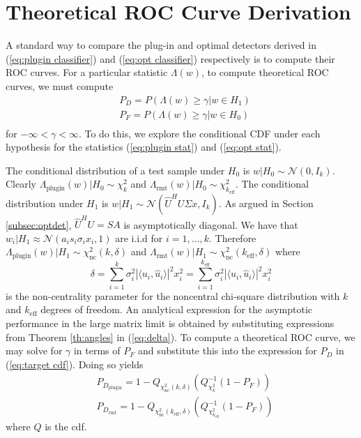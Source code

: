 \section{Theoretical ROC Curve Derivation}\label{sec:roc}
A standard way to compare the plug-in and optimal detectors derived in (\ref{eq:plugin classifier}) and (\ref{eq:opt classifier}) respectively is to compute their ROC curves. For a particular statistic $\Lambda(w)$, to compute theoretical ROC curves, we must compute
\begin{equation}\label{eq:target cdf}
\begin{aligned}
&P_D = P(\Lambda(w) \geq \gamma| w\in H_1)\\
&P_F = P(\Lambda(w) \geq \gamma| w\in H_0)\\
\end{aligned}
\end{equation}
for $-\infty<\gamma<\infty$. To do this, we explore the conditional CDF under each hypothesis for the statistics (\ref{eq:plugin stat}) and (\ref{eq:opt stat}).

The conditional distribution of a test sample under $H_0$ is $w|H_0\sim\mathcal{N}(0,I_k)$. Clearly $\Lambda_\text{plugin}(w)|H_0\sim\chi_k^2$ and $\Lambda_\text{rmt}(w)|H_0\sim\chi_{k_\text{eff}}^2$. The conditional distribution under $H_1$ is $w|H_1\sim\mathcal{N}(\widehat{U}^HU\Sigma x,I_k)$. As argued in Section \ref{subsec:optdet}, $\widehat{U}^HU=SA$ is asymptotically diagonal. We have that $w_i|H_1\approx\mathcal{N}(a_is_i\sigma_ix_i,1)$ are i.i.d for $i=1,\dots,k$. Therefore $\Lambda_\text{plugin}(w)|H_1\sim\chi_\text{nc}^2(k,\delta)$ and $\Lambda_\text{rmt}(w)|H_1\sim\chi_\text{nc}^2(k_\text{eff},\delta)$ where
\begin{equation}\label{eq:delta}
\delta=\sum_{i=1}^k\sigma_i^2|\langle u_i,\widehat{u}_i\rangle|^2x_i^2=\sum_{i=1}^{k_\text{eff}}\sigma_i^2|\langle u_i,\widehat{u}_i\rangle|^2x_i^2
 \end{equation}
is the non-centrality parameter for the noncentral chi-square distribution with $k$ and $k_\text{eff}$ degrees of freedom. An analytical expression for the asymptotic performance in the large matrix limit  is obtained by substituting expressions from Theorem \ref{th:angles} in (\ref{eq:delta}). To compute a theoretical ROC curve, we may solve for $\gamma$ in terms of $P_F$ and substitute this into the expression for $P_D$  in (\ref{eq:target cdf}). Doing so yields
\begin{equation}\label{eq:roc}
\begin{aligned}
&P_{D_\text{plugin}}=1-Q_{\chi_\text{nc}^2(k,\delta)}\left(Q^{-1}_{\chi^2_k}\left(1-P_F\right)\right)\\
&P_{D_\text{rmt}}=1-Q_{\chi_\text{nc}^2(k_\text{eff},\delta)}\left(Q^{-1}_{\chi^2_{k_\text{eff}}}\left(1-P_F\right)\right)
\end{aligned}
\end{equation}
where $Q$ is the cdf.

